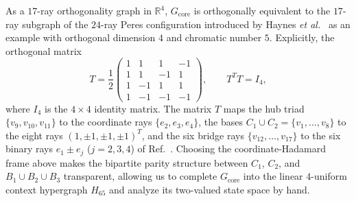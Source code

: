 \documentclass[
  aps,
  pra,
  reprint,
  superscriptaddress,
  amsmath,
  amssymb,
  nofootinbib,
  floatfix
]{revtex4-2}
\theoremstyle{definition}
\theoremstyle{remark}
\newcommand{\R}{\mathbb{R}}
\begin{document}
As a $17$-ray orthogonality graph in $\R^4$, $G_{\mathrm{core}}$ is orthogonally equivalent to the $17$-ray subgraph of the $24$-ray Peres configuration introduced by Haynes \emph{et al.}~\cite[Sec.~1.2, pp.~8--9]{haynes2010orthogonal} as an example with orthogonal dimension $4$ and chromatic number $5$. Explicitly, the orthogonal matrix
\begin{equation}\label{eq:haynes-transform}
T = \frac{1}{2}\begin{pmatrix}
 1 &  1 &  1 & -1\\
 1 &  1 & -1 &  1\\
 1 & -1 &  1 &  1\\
 1 & -1 & -1 & -1
\end{pmatrix},\qquad T^T T = I_4,
\end{equation}
where $I_4$ is the $4\times4$ identity matrix. The matrix $T$ maps the hub triad $\{v_9,v_{10},v_{11}\}$ to the coordinate rays $\{e_2,e_3,e_4\}$, the bases $C_1\cup C_2=\{v_1,\ldots,v_8\}$ to the eight rays $(1,\pm1,\pm1,\pm1)^T$, and the six bridge rays $\{v_{12},\ldots,v_{17}\}$ to the six binary rays $e_1\pm e_j$ ($j=2,3,4$) of Ref.~\cite{haynes2010orthogonal}. Choosing the coordinate-Hadamard frame above makes the bipartite parity structure between $C_1$, $C_2$, and $B_1\cup B_2\cup B_3$ transparent, allowing us to complete $G_{\mathrm{core}}$ into the linear $4$-uniform context hypergraph $H_{65}$ and analyze its two-valued state space by hand.
\end{document}
